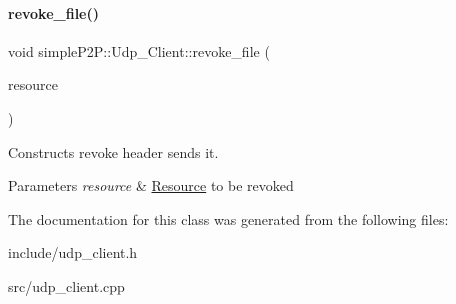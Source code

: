 \paragraph{\texorpdfstring{revoke\+\_\+file()}{revoke\_file()}}
{\footnotesize\ttfamily void simple\+P2\+P\+::\+Udp\+\_\+\+Client\+::revoke\+\_\+file (\begin{DoxyParamCaption}\item[{\hyperlink{classsimpleP2P_1_1Resource}{simple\+P2\+P\+::\+Resource}}]{resource }\end{DoxyParamCaption})}



Constructs revoke header sends it. 


\begin{DoxyParams}{Parameters}
{\em resource} & \hyperlink{classsimpleP2P_1_1Resource}{Resource} to be revoked \\
\hline
\end{DoxyParams}


The documentation for this class was generated from the following files\+:\begin{DoxyCompactItemize}
\item 
include/udp\+\_\+client.\+h\item 
src/udp\+\_\+client.\+cpp\end{DoxyCompactItemize}
